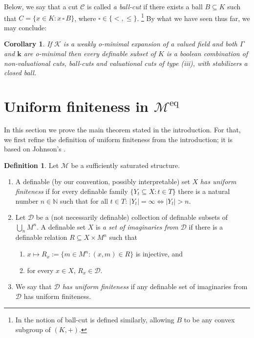 \documentclass[11pt]{amsart}
\DeclareMathOperator{\eq}{eq}
\newtheorem{corollary}[theorem]{Corollary}
\theoremstyle{definition}
\newtheorem{definition}[theorem]{Definition}
\newcommand{\bk}{\textbf{k}}
\newcommand{\CD}{{\mathcal D}}
\newcommand{\CK}{{\mathcal K}}
\newcommand{\CM}{{\mathcal M}}
\newcommand{\CC}{{\mathcal C}}
\newcommand{\0}{\emptyset}
\def\sub{\subseteq}
\begin{document}
 Below, we say that a cut $\CC$ is called {\em a ball-cut} if there exists a ball $B\sub K$ such that $C=\{x\in K: x\, \square\, B\}$, where $\square \in \{<,\leq \}$.
\footnote{In \cite{FVKNar} the notion of ball-cut is defined similarly, allowing $B$ to be any convex subgroup of $(K,+)$.}
 By what we have seen thus far, we may conclude:
\begin{corollary}
	If $\CK$ is a weakly o-minimal expansion of a valued field and both $\Gamma$ and $\bk$ are o-minimal then every definable subset of $K$ is a boolean combination of non-valuational cuts, ball-cuts and valuational cuts of type (iii), with stabilizers a closed ball.
\end{corollary}


\section{Uniform finiteness in $\CM^{\eq}$}
 In this section we prove the main theorem stated in the introduction. For that, we first refine the definition of uniform finiteness from the introduction; it is based on Johnson's  \cite{JohnUF}. 

\begin{definition}\label{D: uniform}
    Let $\CM$ be a sufficiently saturated structure.
    \begin{enumerate}
        \item A definable (by our convention, possibly interpretable) set $X$ \emph{has uniform finiteness} if for every definable family $\{Y_t\subseteq X:t\in T\}$ there is a natural number $n\in \mathbb{N}$ such that for all $t\in T$: $|Y_t|=\infty \iff |Y_t|>n.$
        \item Let $\CD$ be a (not necessarily definable) collection of definable subsets of $\bigcup_n M^n$. A definable set $X$ is \emph{a set of imaginaries from $\CD$} if there is a definable relation $R\subseteq X\times M^n$ such that
        \begin{enumerate}
            \item $x\mapsto R_x:=\{m\in M^n:(x,m)\in R\}$ is injective, and
            \item for every $x\in X$, $R_x\in \CD$.
    \end{enumerate}
    \item 
          We say that \emph{$\CD$ has uniform finiteness} 
         if any definable set of imaginaries from $\CD$ has uniform finiteness.
         \end{enumerate}

\end{definition}
\end{document}
